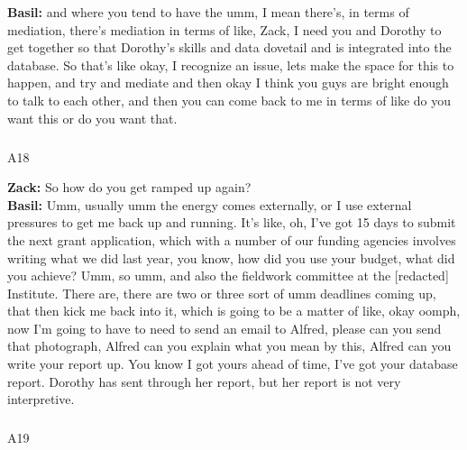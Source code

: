 \documentclass[
  canadian,
]{article}
\makeatletter
\let\oldsubparagraph\subparagraph
\renewcommand{\subparagraph}{
    \@ifstar
      \xxxSubParagraphStar
      \xxxSubParagraphNoStar
  }
\newcommand{\xxxSubParagraphStar}[1]{\oldsubparagraph*{#1}\mbox{}}
\newcommand{\xxxSubParagraphNoStar}[1]{\oldsubparagraph{#1}\mbox{}}
\makeatother
\begin{document}
\textbf{Basil:} and where you tend to have the umm, I mean there's, in
terms of mediation, there's mediation in terms of like, Zack, I need you
and Dorothy to get together so that Dorothy's skills and data dovetail
and is integrated into the database. So that's like okay, I recognize an
issue, lets make the space for this to happen, and try and mediate and
then okay I think you guys are bright enough to talk to each other, and
then you can come back to me in terms of like do you want this or do you
want that.

\subparagraph{A18}\label{sec-A18}

\textbf{Zack:} So how do you get ramped up again?\\
\textbf{Basil:} Umm, usually umm the energy comes externally, or I use
external pressures to get me back up and running. It's like, oh, I've
got 15 days to submit the next grant application, which with a number of
our funding agencies involves writing what we did last year, you know,
how did you use your budget, what did you achieve? Umm, so umm, and also
the fieldwork committee at the {[}redacted{]} Institute. There are,
there are two or three sort of umm deadlines coming up, that then kick
me back into it, which is going to be a matter of like, okay oomph, now
I'm going to have to need to send an email to Alfred, please can you
send that photograph, Alfred can you explain what you mean by this,
Alfred can you write your report up. You know I got yours ahead of time,
I've got your database report. Dorothy has sent through her report, but
her report is not very interpretive.

\subparagraph{A19}\label{sec-A19}
\end{document}

